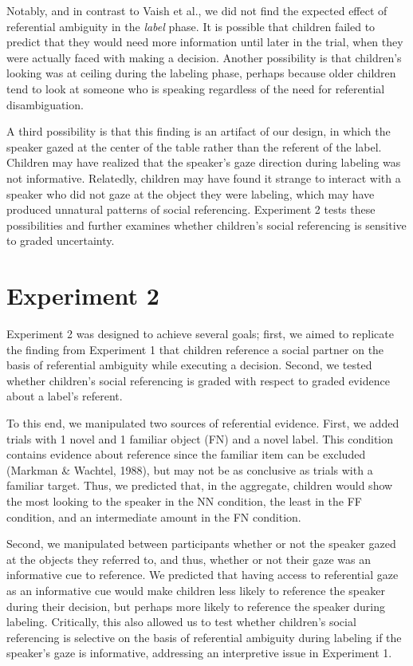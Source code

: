 \documentclass[english,man]{apa6}
\theoremstyle{definition}
\theoremstyle{definition}
\theoremstyle{definition}
\theoremstyle{remark}
\begin{document}
Notably, and in contrast to Vaish et al., we did not find the expected
effect of referential ambiguity in the \emph{label} phase. It is
possible that children failed to predict that they would need more
information until later in the trial, when they were actually faced with
making a decision. Another possibility is that children's looking was at
ceiling during the labeling phase, perhaps because older children tend
to look at someone who is speaking regardless of the need for
referential disambiguation.

A third possibility is that this finding is an artifact of our design,
in which the speaker gazed at the center of the table rather than the
referent of the label. Children may have realized that the speaker's
gaze direction during labeling was not informative. Relatedly, children
may have found it strange to interact with a speaker who did not gaze at
the object they were labeling, which may have produced unnatural
patterns of social referencing. Experiment 2 tests these possibilities
and further examines whether children's social referencing is sensitive
to graded uncertainty.

\section{Experiment 2}\label{experiment-2}

Experiment 2 was designed to achieve several goals; first, we aimed to
replicate the finding from Experiment 1 that children reference a social
partner on the basis of referential ambiguity while executing a
decision. Second, we tested whether children's social referencing is
graded with respect to graded evidence about a label's referent.

To this end, we manipulated two sources of referential evidence. First,
we added trials with 1 novel and 1 familiar object (FN) and a novel
label. This condition contains evidence about reference since the
familiar item can be excluded (Markman \& Wachtel, 1988), but may not be
as conclusive as trials with a familiar target. Thus, we predicted that,
in the aggregate, children would show the most looking to the speaker in
the NN condition, the least in the FF condition, and an intermediate
amount in the FN condition.

Second, we manipulated between participants whether or not the speaker
gazed at the objects they referred to, and thus, whether or not their
gaze was an informative cue to reference. We predicted that having
access to referential gaze as an informative cue would make children
less likely to reference the speaker during their decision, but perhaps
more likely to reference the speaker during labeling. Critically, this
also allowed us to test whether children's social referencing is
selective on the basis of referential ambiguity during labeling if the
speaker's gaze is informative, addressing an interpretive issue in
Experiment 1.
\end{document}

